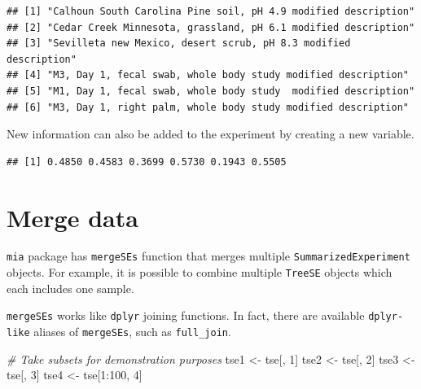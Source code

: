 \documentclass[
]{book}
\newenvironment{Shaded}{\begin{snugshade}}{\end{snugshade}}
\newcommand{\CommentTok}[1]{\textcolor[rgb]{0.56,0.35,0.01}{\textit{#1}}}
\newcommand{\DecValTok}[1]{\textcolor[rgb]{0.00,0.00,0.81}{#1}}
\newcommand{\FunctionTok}[1]{\textcolor[rgb]{0.00,0.00,0.00}{#1}}
\newcommand{\NormalTok}[1]{#1}
\newcommand{\OtherTok}[1]{\textcolor[rgb]{0.56,0.35,0.01}{#1}}
\newcommand{\SpecialCharTok}[1]{\textcolor[rgb]{0.00,0.00,0.00}{#1}}
\begin{document}
\begin{verbatim}
## [1] "Calhoun South Carolina Pine soil, pH 4.9 modified description"  
## [2] "Cedar Creek Minnesota, grassland, pH 6.1 modified description"  
## [3] "Sevilleta new Mexico, desert scrub, pH 8.3 modified description"
## [4] "M3, Day 1, fecal swab, whole body study modified description"   
## [5] "M1, Day 1, fecal swab, whole body study  modified description"  
## [6] "M3, Day 1, right palm, whole body study modified description"
\end{verbatim}

New information can also be added to the experiment by creating a new variable.

\begin{Shaded}
\end{Shaded}

\begin{verbatim}
## [1] 0.4850 0.4583 0.3699 0.5730 0.1943 0.5505
\end{verbatim}

\hypertarget{merge-data}{%
\section{Merge data}\label{merge-data}}

\texttt{mia} package has \texttt{mergeSEs} function that merges multiple \texttt{SummarizedExperiment}
objects. For example, it is possible to combine multiple \texttt{TreeSE} objects which each
includes one sample.

\texttt{mergeSEs} works like \texttt{dplyr} joining functions. In fact, there are available
\texttt{dplyr-like} aliases of \texttt{mergeSEs}, such as \texttt{full\_join}.

\begin{Shaded}
\begin{Highlighting}[]
\CommentTok{\# Take subsets for demonstration purposes}
\NormalTok{tse1 }\OtherTok{\textless{}{-}}\NormalTok{ tse[, }\DecValTok{1}\NormalTok{]}
\NormalTok{tse2 }\OtherTok{\textless{}{-}}\NormalTok{ tse[, }\DecValTok{2}\NormalTok{]}
\NormalTok{tse3 }\OtherTok{\textless{}{-}}\NormalTok{ tse[, }\DecValTok{3}\NormalTok{]}
\NormalTok{tse4 }\OtherTok{\textless{}{-}}\NormalTok{ tse[}\DecValTok{1}\SpecialCharTok{:}\DecValTok{100}\NormalTok{, }\DecValTok{4}\NormalTok{]}
\end{Highlighting}
\end{Shaded}
\end{document}
